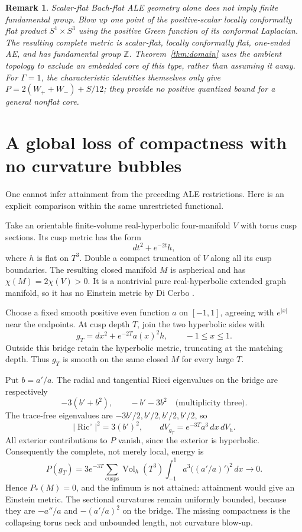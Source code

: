 \documentclass[11pt]{article}
\newtheorem{remark}[theorem]{Remark}
\DeclareMathOperator{\Ric}{Ric}
\DeclareMathOperator{\Vol}{Vol}
\newcommand{\Z}{\mathbb Z}
\begin{document}
\begin{remark}
Scalar-flat Bach-flat ALE geometry alone does not imply finite
fundamental group. Blow up one point of the positive-scalar locally
conformally flat product $S^1\times S^3$ using the positive Green
function of its conformal Laplacian. The resulting complete metric is
scalar-flat, locally conformally flat, one-ended AE, and has fundamental
group $\Z$. Theorem~\ref{thm:domain} uses the ambient topology to
exclude an embedded core of this type, rather than assuming it away.
For $\Gamma=1$, the characteristic identities themselves only give
$P=2(W_++W_-)+S/12$; they provide no positive quantized bound for a
general nonflat core.
\end{remark}

\section{A global loss of compactness with no curvature bubbles}
One cannot infer attainment from the preceding ALE restrictions.
Here is an explicit comparison within the same unrestricted functional.

Take an orientable finite-volume real-hyperbolic four-manifold $V$ with
torus cusp sections. Its cusp metric has the form
\[
 dt^2+e^{-2t}h,
\]
where $h$ is flat on $T^3$. Double a compact truncation of $V$ along
all its cusp boundaries. The resulting closed manifold $M$ is
aspherical and has $\chi(M)=2\chi(V)>0$. It is a nontrivial pure
real-hyperbolic extended graph manifold, so it has no Einstein metric
by Di Cerbo \cite{DiCerbo}.

Choose a fixed smooth positive even function $a$ on $[-1,1]$, agreeing
with $e^{|x|}$ near the endpoints. At cusp depth $T$, join the two
hyperbolic sides with
\[
 g_T=dx^2+e^{-2T}a(x)^2h,\qquad -1\le x\le1.
\]
Outside this bridge retain the hyperbolic metric, truncating at the
matching depth. Thus $g_T$ is smooth on the same closed $M$ for every
large $T$.

Put $b=a'/a$. The radial and tangential Ricci eigenvalues on the
bridge are respectively
\[
 -3(b'+b^2),\qquad -b'-3b^2\quad\text{(multiplicity three)}.
\]
The trace-free eigenvalues are $-3b'/2,b'/2,b'/2,b'/2$, so
\[
 |\Ric^\circ|^2=3(b')^2,\qquad
 dV_{g_T}=e^{-3T}a^3\,dx\,dV_h.
\]
All exterior contributions to $P$ vanish, since the exterior is
hyperbolic. Consequently the complete, not merely local, energy is
\[
 \boxed{P(g_T)=3e^{-3T}
  \sum_{\mathrm{cusps}}\Vol_h(T^3)
  \int_{-1}^{1}a^3\bigl((a'/a)'\bigr)^2\,dx\longrightarrow0.}
\]
Hence $P_*(M)=0$, and the infimum is not attained: attainment would
give an Einstein metric. The sectional curvatures remain uniformly
bounded, because they are $-a''/a$ and $-(a'/a)^2$ on the bridge.
The missing compactness is the collapsing torus neck and unbounded
length, not curvature blow-up.
\end{document}
